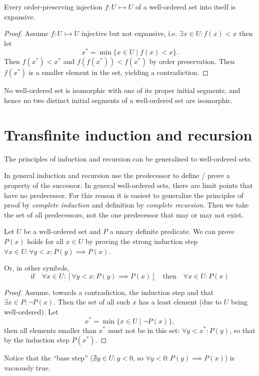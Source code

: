 \begin{proposition} \label{injectionsExpansive}
Every order-preserving injection $f: U\rightarrowtail U$ of a well-ordered set into itself is expansive.
\end{proposition}
\begin{proof}
Assume $f: U\rightarrowtail U$ injective but not expansive, i.e. $\exists x\in U: f(x)<x$ then let
\[ x^* = \min\{x\in U\;|\;f(x)<x\}. \]
Then $f(x^*)<x^*$ and $f(f(x^*)) < f(x^*)$ by order preservation. Then $f(x^*)$ is a smaller element in the set, yielding a contradiction.
\end{proof}
\begin{corollary} \label{properInitialSegmentNotIsomorphic}
No well-ordered set is isomorphic with one of its proper initial
segments, and hence no two distinct initial segments of a well-ordered set are
isomorphic.
\end{corollary}


\section{Transfinite induction and recursion}
The principles of induction and recursion can be generalised to well-ordered sets.

In general induction and recursion use the predecessor to define / prove a property of the successor. In general well-ordered sets, there are limit points that have no predecessor. For this reason it is easiest to generalize the principles of proof by \textit{complete
induction} and definition by \textit{complete recursion}. Then we take the set of all predecessors, not the one predecessor that may or may not exist.

\begin{theorem}
Let $U$ be a well-ordered set and $P$ a unary definite predicate. We can prove $P(x)$ holds for all $x\in U$ by proving the strong induction step $\forall x\in U: \forall y<x: P(y)\implies P(x)$.

Or, in other symbols,
\[ \text{if}\quad  \forall x\in U: \left[\forall y < x: P(y)\implies P(x)\right] \quad \text{then}\quad \forall x\in U: P(x) \]
\end{theorem}
\begin{proof}
Assume, towards a contradiction, the induction step and that $\exists x\in P: \neg P(x)$. Then the set of all such $x$ has a least element (due to $U$ being well-ordered). Let
\[ x^* = \min\{ x\in U\;|\; \neg P(x) \}, \]
then all elements smaller than $x^*$ must not be in this set: $\forall y<x^*: P(y)$, so that by the induction step $P(x^*)$.
\end{proof}
Notice that the ``base step'' ($\nexists y\in U: y<0$, so $\forall y<0: P(y)\implies P(x)$) is vacuously true.

